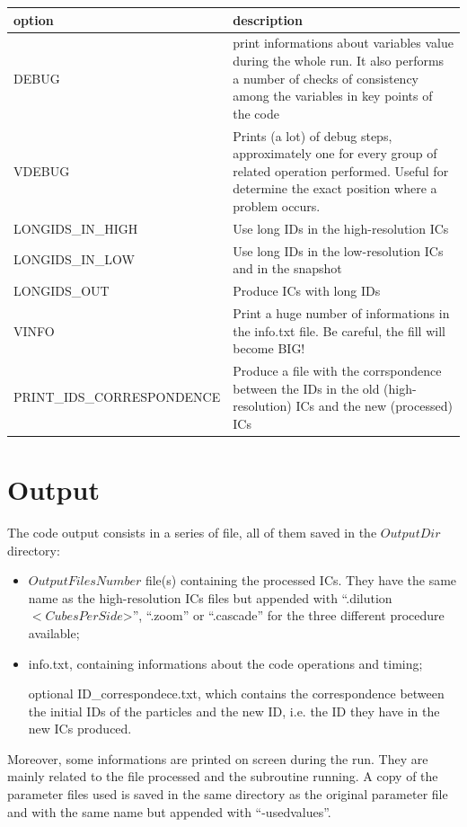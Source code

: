 \documentclass[11pt,a4paper,titlepage]{article}
\newcommand{\virg}[1]{``{#1}''}
\begin{document}
\begin{longtable}{l|p{6cm}}
\textbf{option}                    &  \textbf{description} \\
\hline
DEBUG                              &  print informations about variables value during the whole run. It also performs a number of checks of consistency among the variables in key points of the code \\
VDEBUG                             &  Prints (a lot) of debug steps, approximately one for every group of related operation performed. Useful for determine the exact position where a problem occurs. \\
LONGIDS\_IN\_HIGH                  &  Use long IDs in the high-resolution ICs \\
LONGIDS\_IN\_LOW                   &  Use long IDs in the low-resolution ICs and in the snapshot \\
LONGIDS\_OUT                       &  Produce ICs with long IDs \\
VINFO                              &  Print a huge number of informations in the info.txt file. Be careful, the fill will become BIG! \\
PRINT\_IDS\_CORRESPONDENCE         &  Produce a file with the corrspondence between the IDs in the old (high-resolution) ICs and the new (processed) ICs \\
\hline
\end{longtable}

\section{Output}
The code output consists in a series of file, all of them saved in the $OutputDir$ directory:
\begin{itemize}
\item $OutputFilesNumber$ file(s) containing the processed ICs. They have the same name as the high-resolution ICs files but appended with \virg{.dilution$<CubesPerSide$>}, \virg{.zoom} or \virg{.cascade} for the three different procedure available;
\item info.txt, containing informations about the code operations and timing;
\item [optional] ID\_correspondece.txt, which contains the correspondence between the initial IDs of the particles and the new ID, i.e. the ID they have in the new ICs produced.
\end{itemize}

Moreover, some informations are printed on screen during the run. They are mainly related to the file processed and the subroutine running. A copy of the parameter files used is saved in the same directory as the original parameter file and with the same name but appended with \virg{-usedvalues}.
\end{document}
